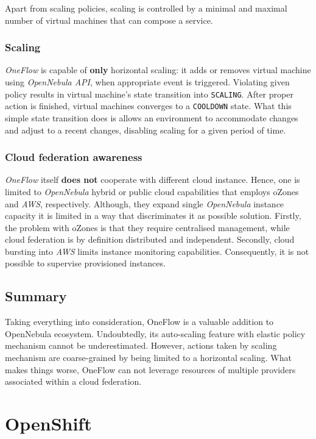 Apart from scaling policies, scaling is controlled by a minimal and maximal number of virtual machines that can compose a service.

\subsubsection{Scaling}
\emph{OneFlow} is capable of \textbf{only} horizontal scaling: it adds or removes virtual machine using \emph{OpenNebula API}, when appropriate event is triggered. Violating given policy results in virtual machine's state transition into \texttt{SCALING}. After proper action is finished, virtual machines converges to a \texttt{COOLDOWN} state. What this simple state transition does is allows an environment to accommodate changes and adjust to a recent changes, disabling scaling for a given period of time.


\subsubsection{Cloud federation awareness}
\emph{OneFlow} itself \textbf{does not} cooperate with different cloud instance. Hence, one is limited to \emph{OpenNebula} hybrid or public cloud capabilities that employs oZones and \emph{AWS}, respectively. Although, they expand single \emph{OpenNebula} instance capacity it is limited in a way that discriminates it as possible solution. Firstly, the problem with oZones is that they require centralised management, while cloud federation is by definition distributed and independent. Secondly, cloud bursting into \emph{AWS} limits instance monitoring capabilities. Consequently, it is not possible to supervise provisioned instances.

\subsection{Summary}
Taking everything into consideration, OneFlow is a valuable addition to OpenNebula ecosystem. Undoubtedly, its auto-scaling feature with elastic policy mechanism cannot be underestimated. However, actions taken by scaling mechanism are coarse-grained by being limited to a horizontal scaling. What makes things worse, OneFlow can not leverage resources of multiple providers associated within a cloud federation.

\section{OpenShift}

